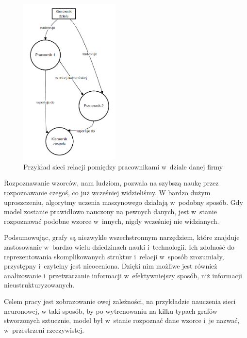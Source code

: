 \begin{figure}[ht]
	\centering
	\includegraphics[height=8.5cm]{resources/introduction/images/social.png}
	\caption{Przykład sieci relacji pomiędzy pracownikami w~dziale danej firmy}
    \label{Fig:intro-5}
\end{figure}
\FloatBarrier

Rozpoznawanie wzorców, nam ludziom, pozwala na szybszą naukę przez rozpoznawanie czegoś, co już wcześniej widzieliśmy.
W bardzo dużym uproszczeniu, algorytmy uczenia maszynowego działają w~podobny sposób.
Gdy model zostanie prawidłowo nauczony na pewnych danych,
jest w~stanie rozpoznawać podobne wzorce w~innych, nigdy wcześniej nie widzianych.

Podsumowując, grafy są niezwykle wszechstronnym narzędziem,
które znajduje zastosowanie w~bardzo wielu dziedzinach nauki i~technologii.
Ich zdolność do reprezentowania skomplikowanych struktur i~relacji w~sposób zrozumiały, przystępny i~czytelny jest nieoceniona.
Dzięki nim możliwe jest również analizowanie i~przetwarzanie informacji w~efektywniejszy sposób,
niż informacji nieustrukturyzowanych. 

Celem pracy jest zobrazowanie owej zależności, na przykładzie nauczenia sieci neuronowej,
w taki sposób, by po wytrenowaniu na kilku typach grafów stworzonych sztucznie,
model był w~stanie rozpoznać dane wzorce i~je nazwać, w~przestrzeni rzeczywistej.